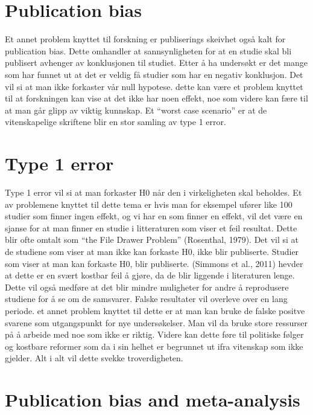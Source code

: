 \documentclass[
  12pt,
]{article}
\begin{document}
\hypertarget{publication-bias}{%
\section{Publication bias}\label{publication-bias}}

Et annet problem knyttet til forskning er publiserings skeivhet også
kalt for publication bias. Dette omhandler at sannsynligheten for at en
studie skal bli publisert avhenger av konklusjonen til studiet. Etter å
ha undersøkt er det mange som har funnet ut at det er veldig få studier
som har en negativ konklusjon. Det vil si at man ikke forkaster vår null
hypotese. dette kan være et problem knyttet til at forskningen kan vise
at det ikke har noen effekt, noe som videre kan fære til at man går
glipp av viktig kunnskap. Et ``worst case scenario'' er at de
vitenskapelige skriftene blir en stor samling av type 1 error.

\hypertarget{type-1-error}{%
\section{Type 1 error}\label{type-1-error}}

Type 1 error vil si at man forkaster H0 når den i virkeligheten skal
beholdes. Et av problemene knyttet til dette tema er hvis man for
eksempel ufører like 100 studier som finner ingen effekt, og vi har en
som finner en effekt, vil det være en sjanse for at man finner en studie
i litteraturen som viser et feil resultat. Dette blir ofte omtalt som
``the File Drawer Problem'' (Rosenthal, 1979). Det vil si at de studiene
som viser at man ikke kan forkaste H0, ikke blir publiserte. Studier som
viser at man kan forkaste H0, blir publiserte. (Simmons et al., 2011)
hevder at dette er en svært kostbar feil å gjøre, da de blir liggende i
literaturen lenge. Dette vil også medføre at det blir mindre muligheter
for andre å reprodusere studiene for å se om de samsvarer. Falske
resultater vil overleve over en lang periode. et annet problem knyttet
til dette er at man kan bruke de falske positve svarene som utgangspunkt
for nye undersøkelser. Man vil da bruke store ressurser på å arbeide med
noe som ikke er riktig. Videre kan dette føre til politiske følger og
kostbare reformer som da i sin helhet er begrunnet ut ifra vitenskap som
ikke gjelder. Alt i alt vil dette svekke troverdigheten.

\hypertarget{publication-bias-and-meta-analysis}{%
\section{Publication bias and
meta-analysis}\label{publication-bias-and-meta-analysis}}
\end{document}
